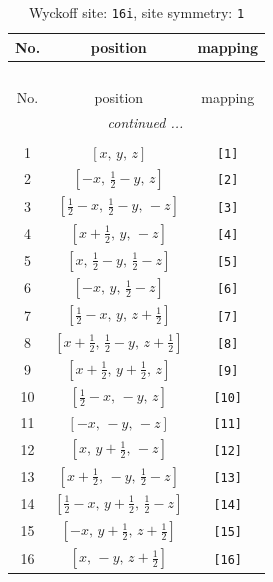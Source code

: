 \documentclass[fleqn,8pt]{jsarticle}
\begin{document}
\begin{longtable}{ccc}
\caption{Wyckoff site: {\tt 16i}, site symmetry: {\tt 1}}
 \\
 \hline \hline
No. & position & mapping \\ \hline \endfirsthead

\multicolumn{2}{l}{\tablename\ \thetable{}} \\
 \hline \hline
No. & position & mapping \\ \hline \endhead

 \hline \hline
\multicolumn{2}{r}{\footnotesize\it continued ...} \\ \endfoot

 \hline \hline
\multicolumn{2}{r}{} \\ \endlastfoot

1 & $\left[ x,\, y,\, z \right]$ & {\tt [1]} \\ \hline
2 & $\left[ - x,\, \frac{1}{2} - y,\, z \right]$ & {\tt [2]} \\ \hline
3 & $\left[ \frac{1}{2} - x,\, \frac{1}{2} - y,\, - z \right]$ & {\tt [3]} \\ \hline
4 & $\left[ x + \frac{1}{2},\, y,\, - z \right]$ & {\tt [4]} \\ \hline
5 & $\left[ x,\, \frac{1}{2} - y,\, \frac{1}{2} - z \right]$ & {\tt [5]} \\ \hline
6 & $\left[ - x,\, y,\, \frac{1}{2} - z \right]$ & {\tt [6]} \\ \hline
7 & $\left[ \frac{1}{2} - x,\, y,\, z + \frac{1}{2} \right]$ & {\tt [7]} \\ \hline
8 & $\left[ x + \frac{1}{2},\, \frac{1}{2} - y,\, z + \frac{1}{2} \right]$ & {\tt [8]} \\ \hline
9 & $\left[ x + \frac{1}{2},\, y + \frac{1}{2},\, z \right]$ & {\tt [9]} \\ \hline
10 & $\left[ \frac{1}{2} - x,\, - y,\, z \right]$ & {\tt [10]} \\ \hline
11 & $\left[ - x,\, - y,\, - z \right]$ & {\tt [11]} \\ \hline
12 & $\left[ x,\, y + \frac{1}{2},\, - z \right]$ & {\tt [12]} \\ \hline
13 & $\left[ x + \frac{1}{2},\, - y,\, \frac{1}{2} - z \right]$ & {\tt [13]} \\ \hline
14 & $\left[ \frac{1}{2} - x,\, y + \frac{1}{2},\, \frac{1}{2} - z \right]$ & {\tt [14]} \\ \hline
15 & $\left[ - x,\, y + \frac{1}{2},\, z + \frac{1}{2} \right]$ & {\tt [15]} \\ \hline
16 & $\left[ x,\, - y,\, z + \frac{1}{2} \right]$ & {\tt [16]} \\
\end{longtable}
\end{document}
